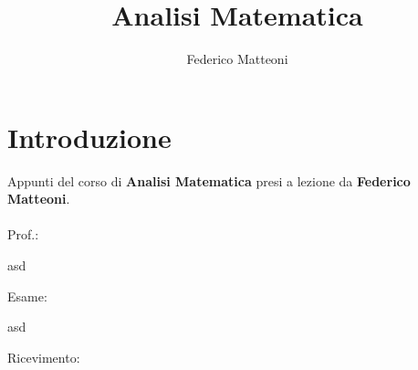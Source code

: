 \documentclass[10pt]{article}
\begin{document}
\title{Analisi Matematica}
\author{Federico Matteoni}
\date{ }
\renewcommand*\contentsname{Indice}

\maketitle
\tableofcontents
\pagebreak
\section{Introduzione}
Appunti del corso di \textbf{Analisi Matematica} presi a lezione da \textbf{Federico Matteoni}.\\\\
Prof.: \\
\begin{list}{-}{Riferimenti web:}
\item asd
\end{list}
Esame:
\begin{list}{-}{Libri e materiale didattico:}
\item asd
\end{list}
Ricevimento:
\end{document}
